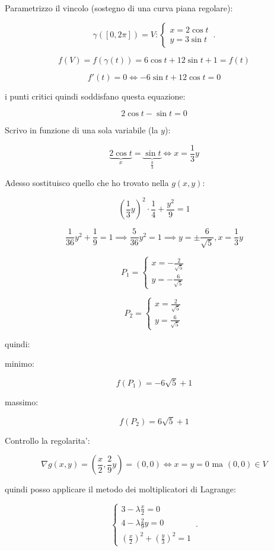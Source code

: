 \documentclass[../appunti-analisi.tex]{subfiles}
\begin{document}
Parametrizzo il vincolo (sostegno di una curva piana regolare):

\[
    \gamma([0,2\pi])=V: \begin{cases}
               x = 2 \cos t\\
               y = 3 \sin t
        \end{cases}\,.
\]

\[
    f(V) = f(\gamma(t)) = 6 \cos t + 12 \sin t + 1 = f(t)
\]

\[
    f'(t) = 0 \Leftrightarrow -6 \sin t + 12 \cos t = 0
\]

i punti critici quindi soddisfano questa equazione:

\[
    2 \cos t - \sin t = 0
\]

Scrivo in funzione di una sola variabile (la $y$):

\[
 \underbrace{2 \cos t}_\text{$x$} = \underbrace{\sin t}_\text{$\frac{y}{3}$}    \Leftrightarrow  x = \frac{1}{3}y
\]

Adesso sostituisco quello che ho trovato nella $g(x,y)$:

\[
    ( \frac{1}{3}y)^{2} \cdot \frac{1}{4} + \frac{y^{2} }{9} = 1
\]

\[
   \frac{1}{36} y ^{2} + \frac{1}{9} = 1  \implies \frac{5}{36} y^{2} = 1 \implies y = \pm \frac{6}{\sqrt{5}}, x = \frac{1}{3}y
\]

\[
   P_1=\begin{cases}
       x= - \frac{2}{\sqrt{5}}\\
        y = -\frac{6}{\sqrt{5}}
   \end{cases} 
\]

\[
   P_2=\begin{cases}
       x=  \frac{2}{\sqrt{5}}\\
        y = \frac{6}{\sqrt{5}}
   \end{cases} 
\]

quindi:

minimo:

\[
    f(P_1) = -6 \sqrt{5} + 1 
\]

massimo:

\[
    f(P_2) = 6 \sqrt{5} + 1
\]

Controllo la regolarita':

\[
    \nabla g(x,y) = ( \frac{x}{2}, \frac{2}{9}y) = (0,0) \Leftrightarrow x=y = 0 \text{ ma } (0,0) \in V
\]

quindi posso applicare il metodo dei moltiplicatori di Lagrange:

\[
        \begin{cases}
               3- \lambda \frac{x}{2} = 0\\
               4 - \lambda \frac{2}{9} y = 0\\
               (\frac{x}{2})^{2}+(\frac{y}{3})^{2}=1
        \end{cases}\,.
\]
\end{document}
